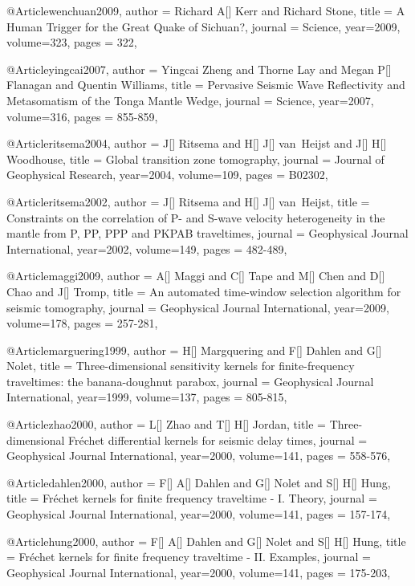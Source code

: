 @Article{wenchuan2009,
  author =	 {Richard A[] Kerr and Richard Stone},
  title =	 {A Human Trigger for the Great Quake of Sichuan?},
  journal =	 {Science},
  year=2009,
  volume=323,
  pages =	 {322},
}

@Article{yingcai2007,
  author =	 {Yingcai Zheng and Thorne Lay and Megan P[] Flanagan and Quentin Williams},
  title =	 {Pervasive Seismic Wave Reflectivity and Metasomatism of the Tonga Mantle Wedge},
  journal =	 {Science},
  year=2007,
  volume=316,
  pages =	 {855-859},
}

@Article{ritsema2004,
  author =	 {J[] Ritsema and H[] J[] van~Heijst and J[] H[] Woodhouse},
  title =	 {Global transition zone tomography},
  journal =	 {Journal of Geophysical Research},
  year=2004,
  volume=109,
  pages =	 {B02302},
}

@Article{ritsema2002,
  author =	 {J[] Ritsema and H[] J[] van~Heijst},
  title =	 {Constraints on the correlation of P- and S-wave velocity heterogeneity in the mantle from P, PP, PPP and PKPAB traveltimes},
  journal =	 {Geophysical Journal International},
  year=2002,
  volume=149,
  pages =	 {482-489},
}

@Article{maggi2009,
  author =	 {A[] Maggi and C[] Tape and M[] Chen and D[] Chao and J[] Tromp},
  title =	 {An automated time-window selection algorithm for seismic tomography},
  journal =	 {Geophysical Journal International},
  year=2009,
  volume=178,
  pages =	 {257-281},
}

@Article{marguering1999,
  author =	 {H[] Margquering and F[] Dahlen and G[] Nolet},
  title =	 {Three-dimensional sensitivity kernels for finite-frequency traveltimes: the banana-doughnut parabox},
  journal =	 {Geophysical Journal International},
  year=1999,
  volume=137,
  pages =	 {805-815},
}

@Article{zhao2000,
  author =	 {L[] Zhao and T[] H[] Jordan},
  title =	 {Three-dimensional Fr\'{e}chet differential kernels for seismic delay times},
  journal =	 {Geophysical Journal International},
  year=2000,
  volume=141,
  pages =	 {558-576},
}

@Article{dahlen2000,
  author =	 {F[] A[] Dahlen and G[] Nolet and S[] H[] Hung},
  title =	 {Fr\'{e}chet kernels for finite frequency traveltime - I. Theory},
  journal =	 {Geophysical Journal International},
  year=2000,
  volume=141,
  pages =	 {157-174},
}

@Article{hung2000,
  author =	 {F[] A[] Dahlen and G[] Nolet and S[] H[] Hung},
  title =	 {Fr\'{e}chet kernels for finite frequency traveltime - II. Examples},
  journal =	 {Geophysical Journal International},
  year=2000,
  volume=141,
  pages =	 {175-203},
}

